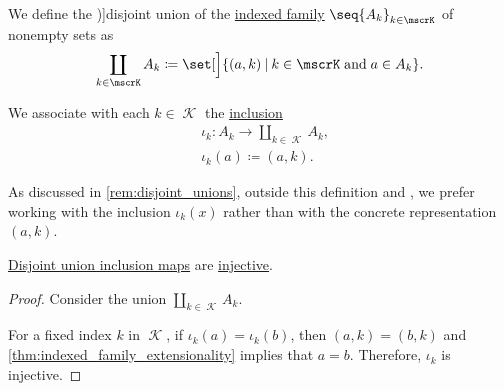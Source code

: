 \begin{definition}\label{def:disjoint_union}
  We define the \term[ru=дизъюнктное произведение, en=disjoint union (\cite[8]{Aluffi2009Algebra})]{disjoint union} of the \hyperref[def:indexed_family]{indexed family} \( \seq{ A_k }_{k \in \mscrK} \) of nonempty sets as
  \begin{equation}\label{eq:def:disjoint_union}
    \coprod_{k \in \mscrK} A_k \coloneqq \set[\Big]{ (a, k) \given k \in \mscrK \T{and} a \in A_k }.
  \end{equation}

  We associate with each \( k \in \mscrK \) the \hyperref[con:inclusion_and_projection]{inclusion}
  \begin{equation*}
    \begin{aligned}
      &\iota_k: A_k \to \coprod_{k \in \mscrK} A_k, \\
      &\iota_k(a) \coloneqq (a, k).
    \end{aligned}
  \end{equation*}
\end{definition}
\begin{comments}
  \item As discussed in \cref{rem:disjoint_unions}, outside this definition and , we prefer working with the inclusion \( \iota_k(x) \) rather than with the concrete representation \( (a, k) \).
\end{comments}

\begin{proposition}\label{thm:disjoint_product_inclusions_injective}
  \hyperref[def:disjoint_union]{Disjoint union inclusion maps} are \hyperref[def:function_invertibility/injective]{injective}.
\end{proposition}
\begin{proof}
  Consider the union \( \coprod_{k \in \mscrK} A_k \).

  For a fixed index \( k \) in \( \mscrK \), if \( \iota_k(a) = \iota_k(b) \), then \( (a, k) = (b, k) \) and \cref{thm:indexed_family_extensionality} implies that \( a = b \). Therefore, \( \iota_k \) is injective.
\end{proof}

